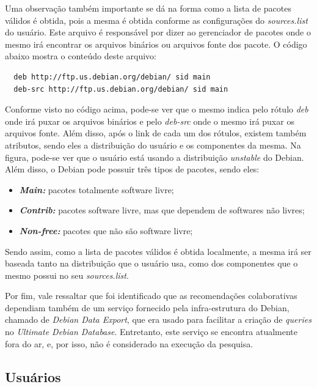 Uma observação também importante se dá na forma como a lista de pacotes válidos
é obtida, pois a mesma é obtida conforme as configurações do \textit{sources.list} do usuário. Este arquivo é responsável
por dizer ao gerenciador de pacotes onde o mesmo irá encontrar os arquivos binários ou
arquivos fonte dos pacote. O código abaixo mostra o conteúdo deste arquivo:

\begin{lstlisting}
  deb http://ftp.us.debian.org/debian/ sid main
  deb-src http://ftp.us.debian.org/debian/ sid main
\end{lstlisting}

Conforme visto no código acima, pode-se ver que o mesmo indica
pelo rótulo \textit{deb} onde irá puxar os arquivos binários e pelo
\textit{deb-src} onde o mesmo irá puxar os arquivos fonte. Além disso, após o
link de cada um dos rótulos, existem também atributos, sendo eles a distribuição
do usuário e os componentes da mesma. Na figura, pode-se ver que o usuário está
usando a distribuição \textit{unstable} do Debian. Além disso, o Debian pode possuir três
tipos de pacotes, sendo eles:

\begin{itemize}
    \item \textit{\textbf{Main:}} pacotes totalmente software livre;
    \item \textit{\textbf{Contrib:}} pacotes software livre, mas que dependem de
        softwares não livres;
    \item \textit{\textbf{Non-free:}} pacotes que não são software livre;
\end{itemize}

Sendo assim, como a lista de pacotes válidos é obtida localmente, a mesma irá ser baseada tanto na
distribuição que o usuário usa, como dos componentes que o mesmo possui no seu
\textit{sources.list}.

Por fim, vale ressaltar que foi identificado que as recomendações
colaborativas dependiam também de um serviço fornecido pela infra-estrutura do
Debian, chamado de \textit{Debian Data Export}, que era usado para facilitar a
criação de \textit{queries} no \textit{Ultimate Debian Database}. Entretanto,
este serviço se encontra atualmente fora do ar, e, por isso, não é considerado
na execução da pesquisa.

\subsection{Usuários} \label{sec:coleta_dados_usuario}


